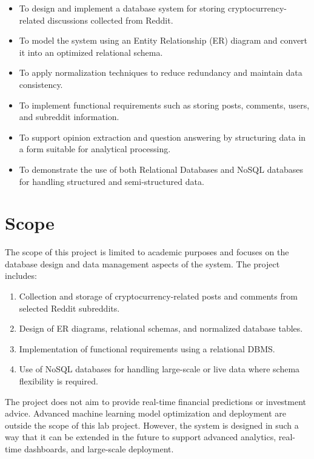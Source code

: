 \begin{itemize}
    \item To design and implement a database system for storing cryptocurrency-related discussions collected from Reddit.
    \item To model the system using an Entity Relationship (ER) diagram and convert it into an optimized relational schema.
    \item To apply normalization techniques to reduce redundancy and maintain data consistency.
    \item To implement functional requirements such as storing posts, comments, users, and subreddit information.
    \item To support opinion extraction and question answering by structuring data in a form suitable for analytical processing.
    \item To demonstrate the use of both Relational Databases and NoSQL databases for handling structured and semi-structured data.
\end{itemize}

\section{Scope}

The scope of this project is limited to academic purposes and focuses on the database design and data management aspects of the system. The project includes:

\begin{enumerate}
    \item Collection and storage of cryptocurrency-related posts and comments from selected Reddit subreddits.
    \item Design of ER diagrams, relational schemas, and normalized database tables.
    \item Implementation of functional requirements using a relational DBMS.
    \item Use of NoSQL databases for handling large-scale or live data where schema flexibility is required.
\end{enumerate}

The project does not aim to provide real-time financial predictions or investment advice. Advanced machine learning model optimization and deployment are outside the scope of this lab project. However, the system is designed in such a way that it can be extended in the future to support advanced analytics, real-time dashboards, and large-scale deployment.

